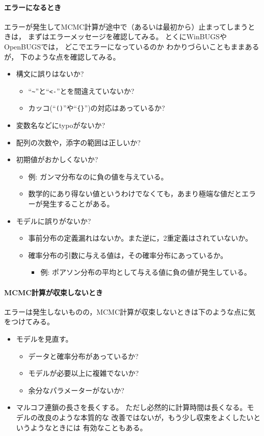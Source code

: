 \documentclass[11pt,uplatex]{jsarticle}
\begin{document}
\paragraph{エラーになるとき}
エラーが発生してMCMC計算が途中で（あるいは最初から）止まってしまうときは，
まずはエラーメッセージを確認してみる。
とくに\textsf{WinBUGS}や\textsf{OpenBUGS}では，
どこでエラーになっているのか わかりづらいこともままあるが，
下のような点を確認してみる。
\begin{itemize}
\item 構文に誤りはないか? 
\begin{itemize}
\item ``\texttt{\textasciitilde}''と``\texttt{<-}''とを間違えていないか?
\item カッコ(``\texttt{()}''や``\texttt{\{\}}'')の対応はあっているか?
\end{itemize}
\item 変数名などにtypoがないか?
\item 配列の次数や，添字の範囲は正しいか?
\item 初期値がおかしくないか?
\begin{itemize}
\item 例: ガンマ分布なのに負の値を与えている。
\item 数学的にあり得ない値というわけでなくても，あまり極端な値だとエラーが発生することがある。
\end{itemize}
\item モデルに誤りがないか?
\begin{itemize}
\item 事前分布の定義漏れはないか。また逆に，2重定義はされていないか。
\item 確率分布の引数に与える値は，その確率分布にあっているか。
\begin{itemize}
\item 例: ポアソン分布の平均として与える値に負の値が発生している。
\end{itemize}
\end{itemize}
\end{itemize}

\paragraph{MCMC計算が収束しないとき}
エラーは発生しないものの，MCMC計算が収束しないときは下のような点に気をつけてみる。
\begin{itemize}
\item モデルを見直す。
\begin{itemize}
\item データと確率分布があっているか?
\item モデルが必要以上に複雑でないか?
\item 余分なパラメーターがないか?
\end{itemize}
\item マルコフ連鎖の長さを長くする。
  ただし必然的に計算時間は長くなる。モデルの改良のような本質的な
  改善ではないが，もう少し収束をよくしたいというようなときには
  有効なこともある。
\end{itemize}
\end{document}
